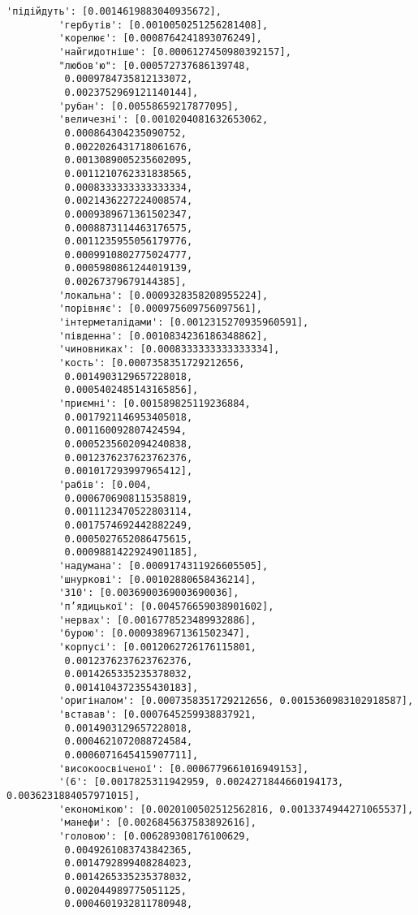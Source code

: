 \documentclass[11pt]{article}
\begin{document}
\begin{Verbatim}[commandchars=\\\{\}]
         'підійдуть': [0.0014619883040935672],
         'гербутів': [0.0010050251256281408],
         'корелює': [0.0008764241893076249],
         'найгидотніше': [0.0006127450980392157],
         "любов'ю": [0.000572737686139748,
          0.0009784735812133072,
          0.0023752969121140144],
         'рубан': [0.00558659217877095],
         'величезні': [0.0010204081632653062,
          0.000864304235090752,
          0.0022026431718061676,
          0.0013089005235602095,
          0.0011210762331838565,
          0.0008333333333333334,
          0.0021436227224008574,
          0.0009389671361502347,
          0.0008873114463176575,
          0.0011235955056179776,
          0.0009910802775024777,
          0.0005980861244019139,
          0.00267379679144385],
         'локальна': [0.0009328358208955224],
         'порівняє': [0.000975609756097561],
         'інтерметалідами': [0.0012315270935960591],
         'південна': [0.0010834236186348862],
         'чиновниках': [0.0008333333333333334],
         'кость': [0.0007358351729212656,
          0.0014903129657228018,
          0.0005402485143165856],
         'приємні': [0.001589825119236884,
          0.0017921146953405018,
          0.001160092807424594,
          0.0005235602094240838,
          0.0012376237623762376,
          0.001017293997965412],
         'рабів': [0.004,
          0.0006706908115358819,
          0.0011123470522803114,
          0.0017574692442882249,
          0.0005027652086475615,
          0.0009881422924901185],
         'надумана': [0.0009174311926605505],
         'шнуркові': [0.00102880658436214],
         '310': [0.0036900369003690036],
         'п’ядицької': [0.004576659038901602],
         'нервах': [0.0016778523489932886],
         'бурою': [0.0009389671361502347],
         'корпусі': [0.0012062726176115801,
          0.0012376237623762376,
          0.0014265335235378032,
          0.0014104372355430183],
         'оригіналом': [0.0007358351729212656, 0.0015360983102918587],
         'вставав': [0.0007645259938837921,
          0.0014903129657228018,
          0.0004621072088724584,
          0.0006071645415907711],
         'високоосвіченої': [0.0006779661016949153],
         '(6': [0.0017825311942959, 0.0024271844660194173, 0.0036231884057971015],
         'економікою': [0.0020100502512562816, 0.0013374944271065537],
         'манефи': [0.0026845637583892616],
         'головою': [0.006289308176100629,
          0.0049261083743842365,
          0.0014792899408284023,
          0.0014265335235378032,
          0.002044989775051125,
          0.0004601932811780948,

\end{Verbatim}
\end{document}
